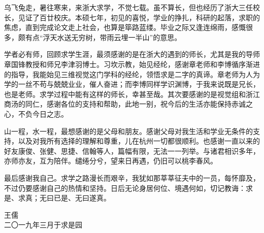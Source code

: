\begin{thanks}

乌飞兔走，暑往寒来，来浙大求学，不觉七载。虽不算长，但也经历了浙大三任校长，见证了百廿校庆。本硕七年，初见的喜悦，学业的挣扎，科研的起落，求职的焦虑，直到完成论文走上社会，也算是筚路蓝缕。毕业之际又逢连绵雨，感慨很多，颇有点“浮天水送无穷树，带雨云埋一半山”的意思。

学者必有师，回顾求学生涯，最须感谢的是在浙大的遇到的师长，尤其是我的导师章国锋教授和师兄李津羽博士。习坎示教，始见经纶，感谢章老师和李博循序渐进的指导，我能始见三维视觉这门学科的经纶，领悟求是二字的真谛。章老师为人为学的一丝不苟与兢兢业业，催人奋进；而李博同样学识渊博，于我来说既是兄长，也是老师。求学过程中能有这样的师长，幸甚至哉。其次要感谢的是视觉组和浙江商汤的同仁，感谢各位的支持和帮助，此地一别，祝今后的生活亦能保持赤诚之心，不负今日之志。

山一程，水一程，最想感谢的是父母和朋友。感谢父母对我生活和学业无条件的支持，以及对我所有选择的理解和尊重，儿在杭州一切都很顺利。也感谢一直以来的好友康俊、张健、思捷、信翰等人，篇幅有限，无法一一列举。与诸君相识多年，亦师亦友，互为陪伴。缱绻分兮，望来日再遇，仍旧可以桃李春风。

最后感谢我自己。求学之路漫长而艰辛，我犹如那莘莘征夫中的一员，每怀靡及，不过仍要感谢自己的热情和坚持。日后无论身居何位、境遇何如，切记教诲：求是、求真；无曰已是、无曰遂真。

\vspace*{\fill}
\begin{flushright}
    王儒 \\
    二〇一九年三月于求是园
\end{flushright}

\end{thanks}
